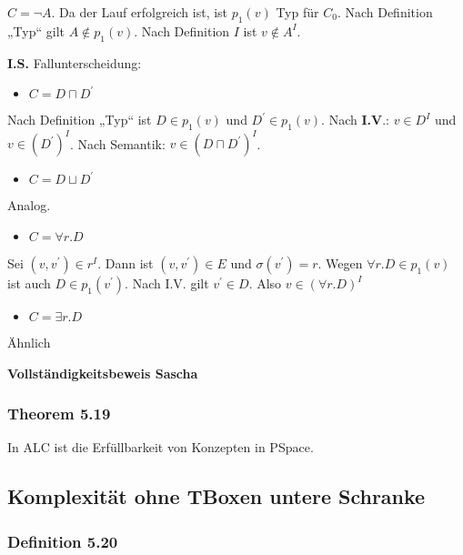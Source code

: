 $C = \neg A$. Da der Lauf erfolgreich ist, ist
$p_{1}\left( v \right)$ Typ für $C_{0}$. Nach Definition „Typ`` gilt
$A \notin p_{1}\left( v \right)$. Nach Definition $I$ ist
$v \notin A^{I}$.

\textbf{I.S.} Fallunterscheidung:

\begin{itemize}
\item
  $C = D \sqcap D^{'}$
\end{itemize}

Nach Definition „Typ`` ist $D \in p_{1}\left( v \right)$ und
$D^{'} \in p_{1}\left( v \right)$. Nach \textbf{I.V}.: $v \in D^{I}$
und $v \in \left( D^{'} \right)^{I}$. Nach Semantik:
$v \in \left( D \sqcap D^{'} \right)^{I}$.

\begin{itemize}
\item
  $C = D \sqcup D^{'}$
\end{itemize}

Analog.

\begin{itemize}
\item
  $C = \forall r.D$
\end{itemize}

Sei $\left( v,v^{'} \right) \in r^{I}$. Dann ist
$\left( v,v^{'} \right) \in E$ und $\sigma\left( v^{'} \right) = r$.
Wegen $\forall r.D \in p_{1}(v)$ ist auch
$D \in p_{1}\left( v^{'} \right)$. Nach I.V. gilt $v^{'} \in D$.
Also $v \in \left( \forall r.D \right)^{I}$

\begin{itemize}
\item
  $C = \exists r.D$
\end{itemize}

Ähnlich

\textbf{Vollständigkeitsbeweis Sascha}

\subsubsection{Theorem 5.19}\label{theorem-5.19}

In ALC ist die Erfüllbarkeit von Konzepten in PSpace.

\subsection{Komplexität ohne TBoxen untere
Schranke}\label{komplexituxe4t-ohne-tboxen-untere-schranke}

\subsubsection{Definition 5.20}\label{definition-5.20}

